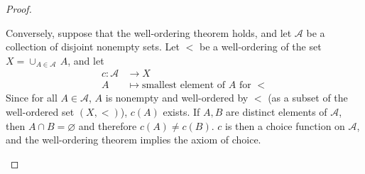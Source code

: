 \documentclass[11pt,a4paper,twoside]{article}
\theoremstyle{definition}
\theoremstyle{plain}
\begin{document}
\begin{proof}
\begin{enumerate}[(a)]
    Conversely, suppose that the well-ordering theorem holds, and let $\mathscr{A}$ be a collection
    of disjoint nonempty sets. Let $<$ be a well-ordering of the set $X = \cup_{A \in \mathscr{A}} \, A$,
    and let
    \begin{align*}
      c \colon \mathscr{A} &\to X \\
      A &\mapsto \text{smallest element of } A \text{ for } <
    \end{align*}
    Since for all $A \in \mathscr{A}$, $A$ is nonempty and well-ordered by $<$ (as a subset of
    the well-ordered set $( X, < )$), $c ( A )$ exists. If $A, B$ are distinct elements
    of $\mathscr{A}$, then $A \cap B = \varnothing$ and therefore $c ( A ) \neq c ( B )$.
    $c$ is then a choice function on $\mathscr{A}$, and the well-ordering theorem implies
    the axiom of choice. \qedhere
    
  \end{enumerate}

\end{proof}
\end{document}
